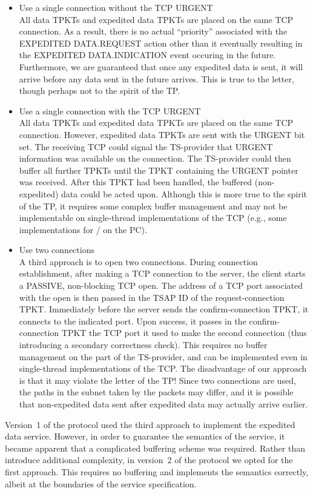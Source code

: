 \begin{itemize}
\item	Use a single connection without the TCP URGENT\\[0.1in]
All data TPKTs and expedited data TPKTs are placed on the same TCP connection.
As a result,
there is no actual ``priority'' associated with the
{\sf EXPEDITED DATA.REQUEST\/} action other than it
eventually resulting in the {\sf EXPEDITED DATA.INDICATION} event occuring in
the future.
Furthermore,
we are guaranteed that once any expedited data is sent,
it will arrive before any data sent in the future arrives.
This is true to the letter, though perhaps not to the spirit of the TP.

\item	Use a single connection with the TCP URGENT\\[0.1in]
All data TPKTs and expedited data TPKTs are placed on the same TCP connection.
However,
expedited data TPKTs are sent with the URGENT bit set.
The receiving TCP could signal the TS-provider that URGENT information was
available on the connection.
The TS-provider could then buffer all further TPKTs until the TPKT
containing the URGENT pointer was received.
After this TPKT had been handled,
the buffered (non-expedited) data could be acted upon.
Although this is more true to the spirit of the TP,
it requires some complex buffer management and may not be implementable on
single-thread implementations of the TCP
(e.g., some implementations for \msdos/ on the PC).

\item	Use two connections\\[0.1in]
A third approach is to open two connections.
During connection establishment,
after making a TCP connection to the server,
the client starts a PASSIVE, non-blocking TCP open.
The address of a TCP port associated with the open is then passed
in the TSAP ID of the request-connection TPKT.
Immediately before the server sends the confirm-connection TPKT,
it connects to the indicated port.
Upon success,
it passes in the confirm-connection TPKT the TCP port it used to make
the second connection (thus introducing a secondary correctness check).
This requires no buffer management on the part of the TS-provider,
and can be implemented even in single-thread implementations of the TCP.
The disadvantage of our approach is that it may violate the letter of the TP!
Since two connections are used,
the paths in the subnet taken by the packets may differ,
and it is possible that non-expedited data sent after expedited data may
actually arrive earlier.
\end{itemize}
Version~1 of the protocol used the third approach to implement the expedited
data service.
However, in order to guarantee the semantics of the service,
it became apparent that a complicated buffering scheme was required.
Rather than introduce additional complexity,
in version~2 of the protocol we opted for the first approach.
This requires no buffering and implements the semantics correctly,
albeit at the boundaries of the service specification.

